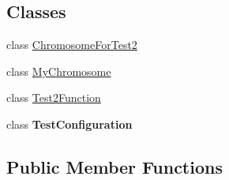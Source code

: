 \subsection*{Classes}
\begin{DoxyCompactItemize}
\item 
class \hyperlink{classorg_1_1jgap_1_1_genotype_test_1_1_chromosome_for_test2}{Chromosome\-For\-Test2}
\item 
class \hyperlink{classorg_1_1jgap_1_1_genotype_test_1_1_my_chromosome}{My\-Chromosome}
\item 
class \hyperlink{classorg_1_1jgap_1_1_genotype_test_1_1_test2_function}{Test2\-Function}
\item 
class {\bfseries Test\-Configuration}
\end{DoxyCompactItemize}
\subsection*{Public Member Functions}
